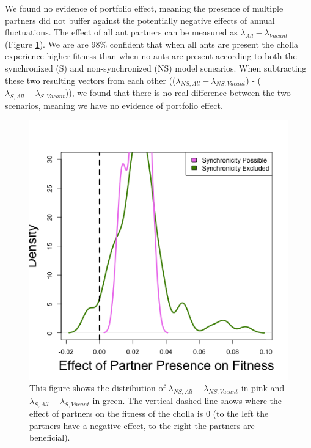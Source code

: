 \documentclass[11pt]{article}
\begin{document}
We found no evidence of portfolio effect, meaning the presence of multiple partners did not buffer against the potentially negative effects of annual fluctuations.
The effect of all ant partners can be measured as $\lambda_{All} - \lambda_{Vacant}$ (Figure \ref{fig:Portfolio}).
We are are 98\% confident that when all ants are present the cholla experience higher fitness than when no ants are present according to both the synchronized (S) and non-synchronized (NS) model scnearios. 
When subtracting these two resulting vectors from each other (($\lambda_{NS,All} - \lambda_{NS,Vacant}$) - ($\lambda_{S,All} - \lambda_{S,Vacant}$)), we found that there is no real difference between the two scenarios, meaning we have no evidence of portfolio effect.

\begin{figure}
	\includegraphics[width=\linewidth]{Figures/portfolio_effect.png}
	\caption{This figure shows the distribution of $\lambda_{NS,All}-\lambda_{NS,Vacant}$ in pink and $\lambda_{S,All}-\lambda_{S,Vacant}$ in green. The vertical dashed line shows where the effect of partners on the fitness of the cholla is 0 (to the left the partners have a negative effect, to the right the partners are beneficial).}
	\label{fig:Portfolio}
\end{figure}
\end{document}
